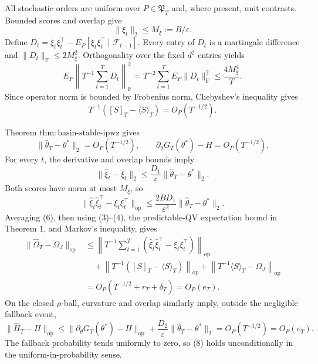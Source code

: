 All stochastic orders are uniform over \(P\in\mathfrak P_T\) and, where present, unit contrasts. Bounded scores and overlap give
\[
 \|\xi_t\|_2\le M_\xi:=B/\varepsilon. \tag{1}
\]
Define \(D_t=\xi_t\xi_t^\top-E_P[\xi_t\xi_t^\top\mid\mathcal F_{t-1}]\). Every entry of \(D_t\) is a martingale difference and \(\|D_t\|_{\mathrm F}\le2M_\xi^2\). Orthogonality over the fixed \(d^2\) entries yields
\[
 E_P\left\|T^{-1}\sum_{t=1}^TD_t\right\|_{\mathrm F}^2
 =T^{-2}\sum_{t=1}^TE_P\|D_t\|_{\mathrm F}^2
 \le\frac{4M_\xi^4}{T}. \tag{2}
\]
Since operator norm is bounded by Frobenius norm, Chebyshev's inequality gives
\[
 T^{-1}([S]_T-\langle S\rangle_T)=O_P(T^{-1/2}). \tag{3}
\]

Theorem \(\mathrm{thm:basin\text{-}stable\text{-}ipwz}\) gives
\[
 \|\widehat\theta_T-\theta^*\|_2=O_P(T^{-1/2}),
 \qquad \partial_\theta G_T(\theta^*)-H=O_P(T^{-1/2}). \tag{4}
\]
For every \(t\), the derivative and overlap bounds imply
\[
 \|\widehat\xi_t-\xi_t\|_2
 \le\frac{D_1}{\varepsilon}\|\widehat\theta_T-\theta^*\|_2. \tag{5}
\]
Both scores have norm at most \(M_\xi\), so
\[
 \|\widehat\xi_t\widehat\xi_t^\top-\xi_t\xi_t^\top\|_{\mathrm{op}}
 \le\frac{2BD_1}{\varepsilon^2}\|\widehat\theta_T-\theta^*\|_2. \tag{6}
\]
Averaging (6), then using (3)--(4), the predictable-QV expectation bound in Theorem 1, and Markov's inequality, gives
\[
\begin{aligned}
 \|\widehat\Omega_T-\Omega_J\|_{\mathrm{op}}
 &\le\left\|T^{-1}\sum_{t=1}^T
 (\widehat\xi_t\widehat\xi_t^\top-\xi_t\xi_t^\top)\right\|_{\mathrm{op}}\\
 &\quad+\left\|T^{-1}([S]_T-\langle S\rangle_T)\right\|_{\mathrm{op}}
 +\left\|T^{-1}\langle S\rangle_T-\Omega_J\right\|_{\mathrm{op}}\\
 &=O_P(T^{-1/2}+r_T+\delta_T)=O_P(e_T). \tag{7}
\end{aligned}
\]
On the closed \(\rho\)-ball, curvature and overlap similarly imply, outside the negligible fallback event,
\[
 \|\widehat H_T-H\|_{\mathrm{op}}
 \le\|\partial_\theta G_T(\theta^*)-H\|_{\mathrm{op}}
 +\frac{D_2}{\varepsilon}\|\widehat\theta_T-\theta^*\|_2
 =O_P(T^{-1/2})=O_P(e_T). \tag{8}
\]
The fallback probability tends uniformly to zero, so (8) holds unconditionally in the uniform-in-probability sense.

